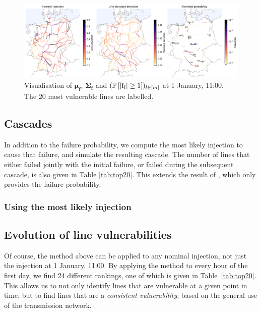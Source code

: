 \documentclass[main.tex]{subfiles}
\begin{document}
\begin{figure}
    \centering
    \includegraphics[width=\textwidth]{img/nomflow_stdev_trueoverloadprob_labeled.pdf}
    \caption{Visualisation of $\bm{\mu}_{\mathbf{f}}$, $\bm{\Sigma}_{\mathbf{f}}$ and $(\operatorname{\mathbb{P}}\left[|{\mathrm{f}}_l| \geq 1 \right])_{l \in [m]}$ at 1 January, 11:00. The 20 most vulnerable lines are labelled.}
    \label{fig:nomflow_stdev_overload}
\end{figure}

\subsection{Cascades}
In addition to the failure probability, we compute the most likely injection to cause that failure, and simulate the resulting cascade. The number of lines that either failed jointly with the initial failure, or failed during the subsequent cascade, is also given in Table \ref{tab:top20}. This extends the result of \cite{Nesti2018supplemental}, which only provides the failure probability.


\subsubsection{Using the most likely injection}


\subsection{Evolution of line vulnerabilities}
Of course, the method above can be applied to any nominal injection, not just the injection at 1 January, 11:00. By applying the method to every hour of the first day, we find 24 different rankings, one of which is given in Table~\ref{tab:top20}. This allows us to not only identify lines that are vulnerable at a given point in time, but to find lines that are a \emph{consistent vulnerability}, based on the general use of the transmission network.
\end{document}
